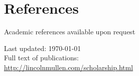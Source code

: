 \documentclass[11pt]{article}
\begin{document}
\section*{References}
\noindent
Academic references available upon request

\vfill{}

\begin{center}
{\scriptsize 
Last updated: \today\\[.25cm]
Full text of publications:\\
\href{http://lincolnmullen.com/scholarship.html}{http://lincolnmullen.com/scholarship.html}\\[.1cm]
}
\end{center}
\end{document}
